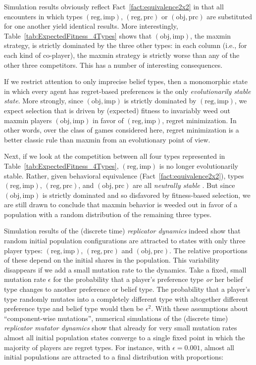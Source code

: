 \documentclass[fleqn,reqno,11pt]{article}
\begin{document}
Simulation results obviously reflect Fact~\ref{fact:equivalence2x2} in that all encounters in
which types $(\text{reg}, \text{imp})$, $(\text{reg}, \text{prc})$ or
$(\text{obj}, \text{prc})$ are substituted for one another yield identical results. More
interestingly, Table~\ref{tab:ExpectedFitness_4Types} shows that $(\text{obj}, \text{imp})$,
the maxmin strategy, is strictly dominated by the three other types: in each column (i.e.,
for each kind of co-player), the maxmin strategy is strictly worse than any of the other three
competitors. This has a number of interesting consequences.

If we restrict attention to only imprecise belief types, then a monomorphic state in which every agent has
regret-based preferences is the only \emph{evolutionarily stable state}. More strongly, since
$(\text{obj}, \text{imp})$ is strictly dominated by $(\text{reg}, \text{imp})$, we expect
selection that is driven by (expected) fitness to invariably weed out maxmin players $(\text{obj}, \text{imp})$ in favor of $(\text{reg}, \text{imp})$, regret minimization. 
In other
words, over the class of games considered here, regret
minimization is a better classic rule than maxmin from an evolutionary point of
view.

Next, if we look at the competition between all four types represented in
Table~\ref{tab:ExpectedFitness_4Types}, $(\text{reg}, \text{imp})$ is no longer evolutionarily
stable. Rather, given behavioral equivalence (Fact~\ref{fact:equivalence2x2}), types
$(\text{reg}, \text{imp})$, $(\text{reg}, \text{prc})$, and $(\text{obj}, \text{prc})$ are all
\emph{neutrally stable} \citep{Maynard-Smith1982:Evolution-and-t}. But since
$(\text{obj}, \text{imp})$ is strictly dominated and so disfavored by fitness-based selection,
we are still drawn to conclude that maxmin behavior is weeded out in favor of a population with
a random distribution of the remaining three types.

Simulation results of the (discrete time) \emph{replicator dynamics}
\citep{TaylorJonker1978:Evolutionary-St} indeed show that random initial population
configurations are attracted to states with only three player types:
$(\text{reg}, \text{imp})$, $(\text{reg}, \text{prc})$ and $(\text{obj}, \text{prc})$. The
relative proportions of these depend on the initial shares in the population. This variability disappears if
we add a small mutation rate to the dynamics. Take a fixed, small mutation rate $\epsilon$ for
the probability that a player's preference type \emph{or} her belief type changes to another
preference or belief type. The probability that a player's type randomly mutates into a
completely different type with altogether different preference type and belief type would
then be $\epsilon^2$. With these assumptions about ``component-wise mutations'', numerical
simulations of the (discrete time) \emph{replicator mutator dynamics}
\citep{Nowak2006:Evolutionary-Dy} show that already for very small mutation rates almost all
initial population states converge to a single fixed point in which the majority of players are
regret types. For instance, with $\epsilon = 0.001$, almost all initial populations are
attracted to a final distribution with proportions:
\end{document}
